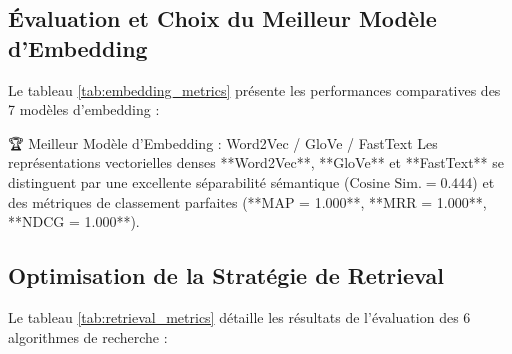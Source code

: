 \documentclass[12pt,a4paper,oneside]{report}
\begin{document}
\subsection{Évaluation et Choix du Meilleur Modèle d'Embedding}
Le tableau \ref{tab:embedding_metrics} présente les performances comparatives des 7 modèles d'embedding :

\begin{table}[H]
\centering
\small
\caption{Benchmark des 7 modèles d'Embedding (Données Identiques Plateforme)}
\label{tab:embedding_metrics}
\end{table}

\begin{bestbox}{🏆 Meilleur Modèle d'Embedding : Word2Vec / GloVe / FastText}
Les représentations vectorielles denses **Word2Vec**, **GloVe** et **FastText** se distinguent par une excellente séparabilité sémantique ($\text{Cosine Sim.} = 0.444$) et des métriques de classement parfaites (**MAP = 1.000**, **MRR = 1.000**, **NDCG = 1.000**).
\end{bestbox}

\subsection{Optimisation de la Stratégie de Retrieval}
Le tableau \ref{tab:retrieval_metrics} détaille les résultats de l'évaluation des 6 algorithmes de recherche :
\end{document}
